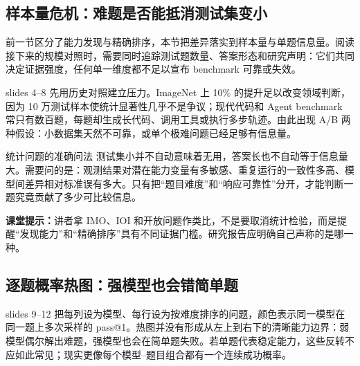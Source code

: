 \subsection{样本量危机：难题是否能抵消测试集变小}

前一节区分了能力发现与精确排序，本节把差异落实到样本量与单题信息量。阅读接下来的规模对照时，需要同时追踪测试题数量、答案形态和研究声明：它们共同决定证据强度，任何单一维度都不足以宣布 benchmark 可靠或失效。

slides 4--8 先用历史对照建立压力。ImageNet 上 10\% 的提升足以改变领域判断，因为 10 万测试样本使统计显著性几乎不是争议；现代代码和 Agent benchmark 常只有数百题，每题却生成长代码、调用工具或执行多步轨迹。由此出现 A/B 两种假设：小数据集天然不可靠，或单个极难问题已经足够有信息量。


\begin{importantbox}{统计问题的准确问法}
测试集小并不自动意味着无用，答案长也不自动等于信息量大。需要问的是：观测结果对潜在能力变量有多敏感、重复运行的一致性多高、模型间差异相对标准误有多大。只有把“题目难度”和“响应可靠性”分开，才能判断一题究竟贡献了多少可比较信息。
\end{importantbox}

\textbf{课堂提示：}讲者拿 IMO、IOI 和开放问题作类比，不是要取消统计检验，而是提醒“发现能力”和“精确排序”具有不同证据门槛。研究报告应明确自己声称的是哪一种。

\subsection{逐题概率热图：强模型也会错简单题}

slides 9--12 把每列设为模型、每行设为按难度排序的问题，颜色表示同一模型在同一题上多次采样的 pass@1。热图并没有形成从左上到右下的清晰能力边界：弱模型偶尔解出难题，强模型也会在简单题失败。若单题代表稳定能力，这些反转不应如此常见；现实更像每个模型--题目组合都有一个连续成功概率。



